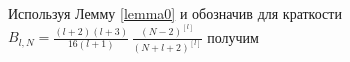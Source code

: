 \documentclass[12pt]{book}
\begin{document}
Используя Лемму \eqref{lemma0} и обозначив для краткости $B_{l,N} = \frac{(l+2)(l+3)}{16(l+1)}\,\frac{(N-2)^{[l]}}{(N+l+2)^{[l]}} $
получим
%
%
%
%
%
%
%
\end{document}
